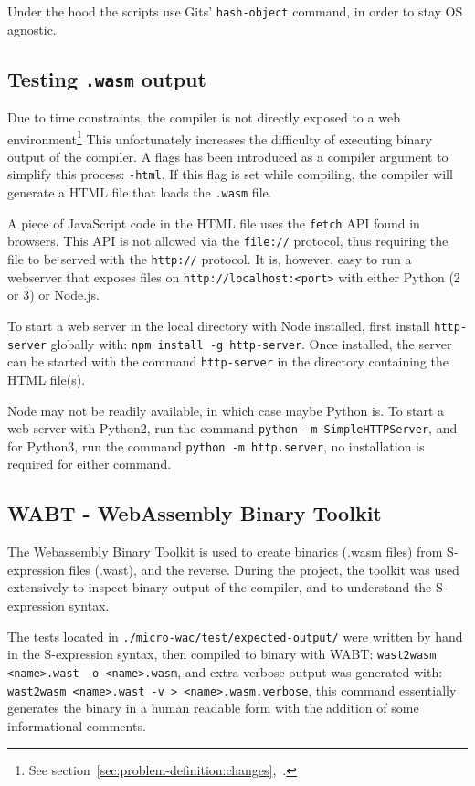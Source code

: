 \documentclass[a4paper]{article}
\begin{document}
Under the hood the scripts use Gits' \texttt{hash-object} command, in order to stay OS agnostic.

\subsection{Testing \texttt{.wasm} output}
\label{sec:peripherals:testing-wasm}
Due to time constraints, the compiler is not directly exposed to a web environment\footnote{See section~\ref{sec:problem-definition:changes},~.} This unfortunately increases the difficulty of executing binary output of the compiler. A flags has been introduced as a compiler argument to simplify this process: \texttt{-html}. If this flag is set while compiling, the compiler will generate a HTML file that loads the \texttt{.wasm} file.

A piece of JavaScript code in the HTML file uses the \texttt{fetch} API found in browsers. This API is not allowed via the \texttt{file://} protocol, thus requiring the file to be served with the \texttt{http://} protocol. It is, however, easy to run a webserver that exposes files on \texttt{http://localhost:<port>} with either Python (2 or 3) or Node.js.

To start a web server in the local directory with Node installed, first install \texttt{http-server} globally with: \verb$npm install -g http-server$. Once installed, the server can be started with the command \texttt{http-server} in the directory containing the HTML file(s).

Node may not be readily available, in which case maybe Python is. To start a web server with Python2, run the command \texttt{python -m SimpleHTTPServer}, and for Python3, run the command \texttt{python -m http.server}, no installation is required for either command.

\subsection{WABT - WebAssembly Binary Toolkit}
\label{sec:peripherals:wabt}
The Webassembly Binary Toolkit is used to create binaries (.wasm files) from S-expression files (.wast), and the reverse. During the project, the toolkit was used extensively to inspect binary output of the compiler, and to understand the S-expression syntax.

The tests located in \texttt{./micro-wac/test/expected-output/} were written by hand in the S-expression syntax, then compiled to binary with WABT: \texttt{wast2wasm <name>.wast -o <name>.wasm}, and extra verbose output was generated with: \texttt{wast2wasm <name>.wast -v > <name>.wasm.verbose}, this command essentially generates the binary in a human readable form with the addition of some informational comments.
\end{document}
